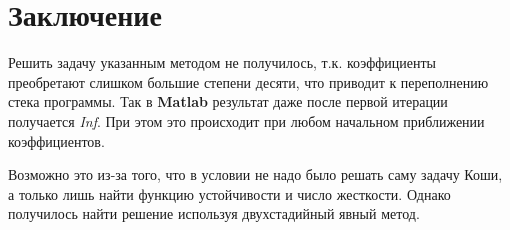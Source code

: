 \documentclass[12pt,a4paper]{article}
\begin{document}


\section{Заключение} %
\label{sec:summary}

Решить задачу указанным методом не получилось, т.к. коэффициенты преобретают слишком большие степени десяти, что приводит к переполнению стека программы. Так в {\bf Matlab} результат даже после первой итерации получается {\it Inf}. При этом это происходит при любом начальном приближении коэффициентов. \par
Возможно это из-за того, что в условии не надо было решать саму задачу Коши, а только лишь найти функцию устойчивости и число жесткости. Однако получилось найти решение используя двухстадийный явный метод. \par

\end{document}
